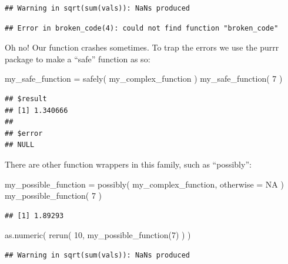 \documentclass[
]{book}
\newenvironment{Shaded}{\begin{snugshade}}{\end{snugshade}}
\newcommand{\AttributeTok}[1]{\textcolor[rgb]{0.77,0.63,0.00}{#1}}
\newcommand{\ConstantTok}[1]{\textcolor[rgb]{0.00,0.00,0.00}{#1}}
\newcommand{\DecValTok}[1]{\textcolor[rgb]{0.00,0.00,0.81}{#1}}
\newcommand{\FunctionTok}[1]{\textcolor[rgb]{0.00,0.00,0.00}{#1}}
\newcommand{\NormalTok}[1]{#1}
\newcommand{\OtherTok}[1]{\textcolor[rgb]{0.56,0.35,0.01}{#1}}
\begin{document}
\begin{verbatim}
## Warning in sqrt(sum(vals)): NaNs produced
\end{verbatim}

\begin{verbatim}
## Error in broken_code(4): could not find function "broken_code"
\end{verbatim}

Oh no! Our function crashes sometimes.
To trap the errors we use the purrr package to make a ``safe'' function as so:

\begin{Shaded}
\begin{Highlighting}[]
\NormalTok{my\_safe\_function }\OtherTok{=} \FunctionTok{safely}\NormalTok{( my\_complex\_function )}
\FunctionTok{my\_safe\_function}\NormalTok{( }\DecValTok{7}\NormalTok{ )}
\end{Highlighting}
\end{Shaded}

\begin{verbatim}
## $result
## [1] 1.340666
## 
## $error
## NULL
\end{verbatim}

There are other function wrappers in this family, such as ``possibly'':

\begin{Shaded}
\begin{Highlighting}[]
\NormalTok{my\_possible\_function }\OtherTok{=} \FunctionTok{possibly}\NormalTok{( my\_complex\_function, }
                                 \AttributeTok{otherwise =} \ConstantTok{NA}\NormalTok{ )}
\FunctionTok{my\_possible\_function}\NormalTok{( }\DecValTok{7}\NormalTok{ )}
\end{Highlighting}
\end{Shaded}

\begin{verbatim}
## [1] 1.89293
\end{verbatim}

\begin{Shaded}
\begin{Highlighting}[]
\FunctionTok{as.numeric}\NormalTok{( }\FunctionTok{rerun}\NormalTok{( }\DecValTok{10}\NormalTok{, }\FunctionTok{my\_possible\_function}\NormalTok{(}\DecValTok{7}\NormalTok{) ) )}
\end{Highlighting}
\end{Shaded}

\begin{verbatim}
## Warning in sqrt(sum(vals)): NaNs produced
\end{verbatim}
\end{document}
